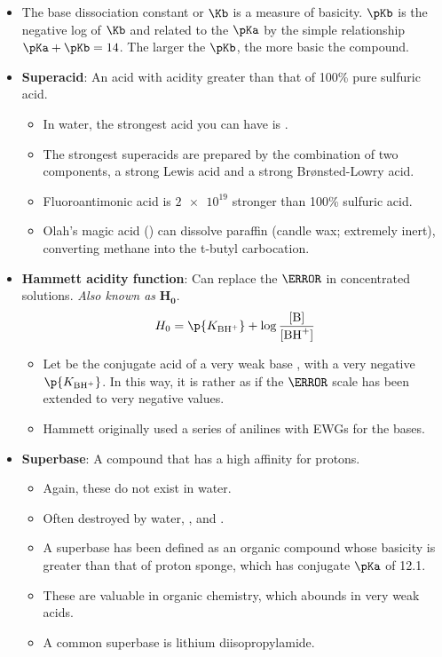 \documentclass[../notes.tex]{subfiles}
\begin{document}
\begin{itemize}
    \item The base dissociation constant or $\Kb$ is a measure of basicity. $\pKb$ is the negative log of $\Kb$ and related to the $\pKa$ by the simple relationship $\pKa+\pKb=14$. The larger the $\pKb$, the more basic the compound.
    \item \textbf{Superacid}: An acid with acidity greater than that of 100\% pure sulfuric acid.
    \begin{itemize}
        \item In water, the strongest acid you can have is .
        \item The strongest superacids are prepared by the combination of two components, a strong Lewis acid and a strong Br{\o}nsted-Lowry acid.
        \item Fluoroantimonic acid  is $\num{2e19}$ stronger than 100\% sulfuric acid.
        \item Olah's magic acid () can dissolve paraffin (candle wax; extremely inert), converting methane into the t-butyl carbocation.
    \end{itemize}
    \item \textbf{Hammett acidity function}: Can replace the $\pH$ in concentrated solutions. \emph{Also known as} $\bm{H_0}$.
    \begin{equation*}
        H_0 = \p{K_{\ce{BH^+}}}+\log\frac{[\ce{B}]}{[\ce{BH^+}]}
    \end{equation*}
    \begin{itemize}
        \item Let  be the conjugate acid of a very weak base , with a very negative $\p{K_{\ce{BH+}}}$. In this way, it is rather as if the $\pH$ scale has been extended to very negative values.
        \item Hammett originally used a series of anilines with EWGs for the bases.
    \end{itemize}
    \item \textbf{Superbase}: A compound that has a high affinity for protons.
    \begin{itemize}
        \item Again, these do not exist in water.
        \item Often destroyed by water, , and .
        \item A superbase has been defined as an organic compound whose basicity is greater than that of proton sponge, which has conjugate $\pKa$ of 12.1.
        \item These are valuable in organic chemistry, which abounds in very weak acids.
        \item A common superbase is lithium diisopropylamide.
    \end{itemize}
\end{itemize}
\end{document}
